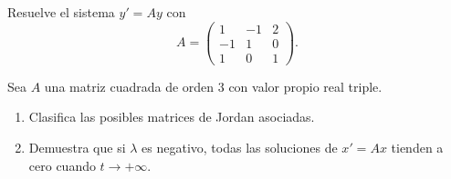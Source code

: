 \documentclass[12pt]{article}
\begin{document}
    \begin{ejercicio}
        Resuelve el sistema $y' = Ay$ con
        \[
            A = \begin{pmatrix}
                1 & -1 & 2 \\
                -1 & 1 & 0 \\
                1 & 0 & 1
            \end{pmatrix}.
        \]
    \end{ejercicio}

    \begin{ejercicio}
        Sea $A$ una matriz cuadrada de orden 3 con valor propio real triple.
        \begin{enumerate}
            \item Clasifica las posibles matrices de Jordan asociadas.
            \item Demuestra que si $\lambda$ es negativo, todas las soluciones de $x' = Ax$ tienden a cero cuando $t \to +\infty$.
        \end{enumerate}
    \end{ejercicio}
\end{document}
